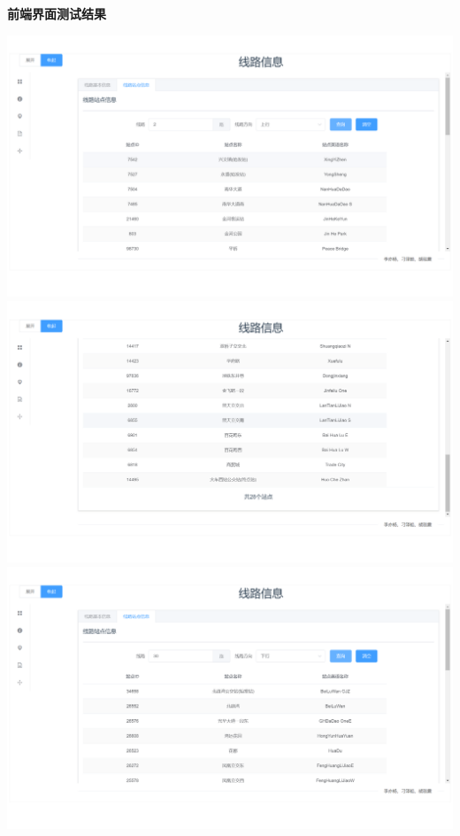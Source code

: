 \documentclass[11pt,a4paper]{article}
\begin{document}
\textbf{前端界面测试结果} \\
\begin{center}
\centering
\includegraphics[scale=0.3]{./assets/demand2_1.png} \\ 
\includegraphics[scale=0.3]{./assets/demand2_2.png} \\ 
\includegraphics[scale=0.3]{./assets/demand2_3.png} \\ 

\end{center}
\end{document}
